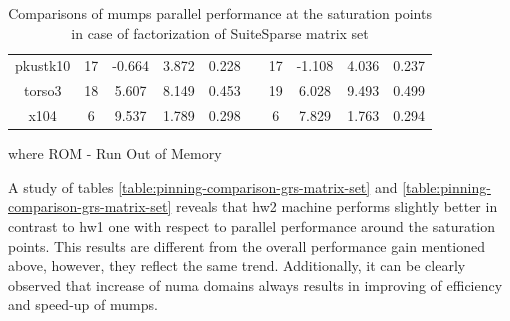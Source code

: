 \begin{table}[htpb]
\begin{tabular}{c|c|c|c|c|c|c|c|c|c|}
\multicolumn{1}{|c|}{pkustk10}                                              & 17  & -0.664                                                                & 3.872                                              & 0.228                                                  &  & 17  & -1.108                                                                & 4.036                                              & 0.237                                                  \\ \cline{1-5} \cline{7-10} 
\multicolumn{1}{|c|}{torso3}                                                & 18  & 5.607                                                                 & 8.149                                              & 0.453                                                  &  & 19  & 6.028                                                                 & 9.493                                              & 0.499                                                  \\ \cline{1-5} \cline{7-10} 
\multicolumn{1}{|c|}{x104}                                                  & 6   & 9.537                                                                 & 1.789                                              & 0.298                                                  &  & 6   & 7.829                                                                 & 1.763                                              & 0.294                                                  \\ \cline{1-5} \cline{7-10} 
\end{tabular}
\caption{Comparisons of \acrshort{mumps} parallel performance at the saturation points in case of factorization of SuiteSparse matrix set}
where ROM - Run Out of Memory
\label{table:pinning-comparison-suitesparse-matrix-set}
\end{table}


A study of tables \ref{table:pinning-comparison-grs-matrix-set} and \ref{table:pinning-comparison-grs-matrix-set} reveals that \gls{hw2} machine performs slightly better in contrast to \gls{hw1} one with respect to parallel performance around the saturation points. This results are different from the overall performance gain mentioned above, however, they reflect the same trend. Additionally, it can be clearly observed that increase of \acrshort{numa} domains always results in improving of efficiency and speed-up of \acrshort{mumps}.\\

